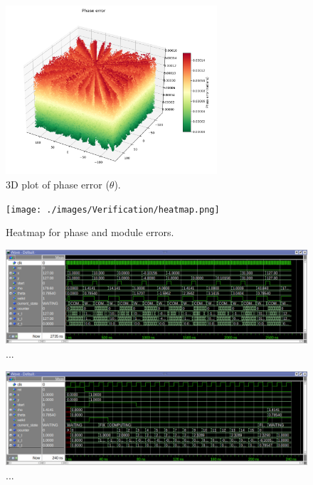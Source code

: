 \begin{figure}[H]
    \centering
    \includegraphics[width=0.7\textwidth]{./images/Verification/phase_error.png}
    \caption{3D plot of phase error (\( \theta \)).}
    \label{fig:phase_error}
\end{figure}

\begin{figure}[H]
    \centering
    \texttt{[image: ./images/Verification/heatmap.png]}
    \caption{Heatmap for phase and module errors.}
    \label{fig:heatmap_error}
\end{figure}



\begin{figure}[!ht]
    \centering
    \includegraphics[width=\textwidth]{./images/Verification/wavebig.png}
    \caption{...}
    \label{fig:wavebig}
\end{figure}


\begin{figure}[!ht]
    \centering
    \includegraphics[width=\textwidth]{./images/Verification/wavesmall.png}
    \caption{...}
    \label{fig:wavesmall}
\end{figure}


